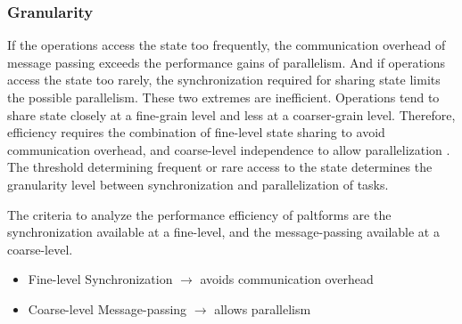 \subsubsection{Granularity} \label{chapter3:definitions:efficiency:granularity}

If the operations access the state too frequently, the communication overhead of message passing exceeds the performance gains of parallelism.
And if operations access the state too rarely, the synchronization required for sharing state limits the possible parallelism.
These two extremes are inefficient.
Operations tend to share state closely at a fine-grain level and less at a coarser-grain level.
Therefore, efficiency requires the combination of fine-level state sharing to avoid communication overhead, and coarse-level independence to allow parallelization \cite{Gustafson1988,Gunther1996,Nelson1996,Gunther2002}.
The threshold determining frequent or rare access to the state determines the granularity level between synchronization and parallelization of tasks.

\separator


The criteria to analyze the performance efficiency of paltforms are the synchronization available at a fine-level, and the message-passing available at a coarse-level.

\begin{itemize}
\item Fine-level Synchronization
  \subitem $\to$ avoids communication overhead
\item Coarse-level Message-passing
  \subitem $\to$ allows parallelism
\end{itemize}


